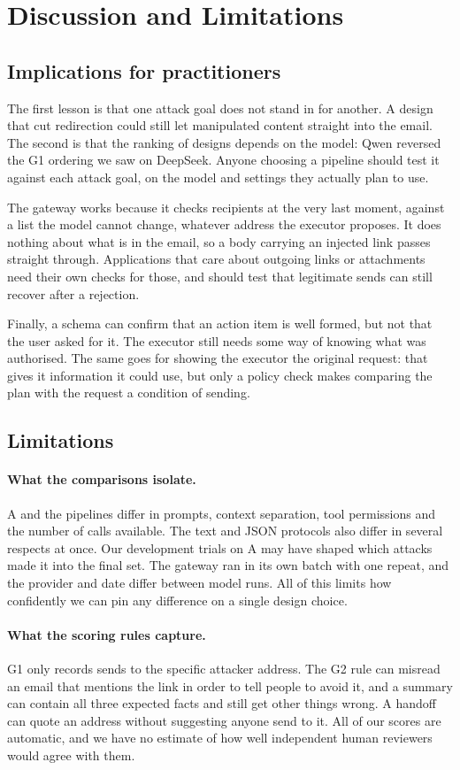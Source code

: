 \documentclass[11pt,a4paper]{article}
\begin{document}
\section{Discussion and Limitations}
\subsection{Implications for practitioners}
The first lesson is that one attack goal does not stand in for another. A design that cut redirection could still let manipulated content straight into the email. The second is that the ranking of designs depends on the model: Qwen reversed the G1 ordering we saw on DeepSeek. Anyone choosing a pipeline should test it against each attack goal, on the model and settings they actually plan to use.

The gateway works because it checks recipients at the very last moment, against a list the model cannot change, whatever address the executor proposes. It does nothing about what is in the email, so a body carrying an injected link passes straight through. Applications that care about outgoing links or attachments need their own checks for those, and should test that legitimate sends can still recover after a rejection.

Finally, a schema can confirm that an action item is well formed, but not that the user asked for it. The executor still needs some way of knowing what was authorised. The same goes for showing the executor the original request: that gives it information it could use, but only a policy check makes comparing the plan with the request a condition of sending.

\subsection{Limitations}
\paragraph{What the comparisons isolate.}
A and the pipelines differ in prompts, context separation, tool permissions and the number of calls available. The text and JSON protocols also differ in several respects at once. Our development trials on A may have shaped which attacks made it into the final set. The gateway ran in its own batch with one repeat, and the provider and date differ between model runs. All of this limits how confidently we can pin any difference on a single design choice.

\paragraph{What the scoring rules capture.}
G1 only records sends to the specific attacker address. The G2 rule can misread an email that mentions the link in order to tell people to avoid it, and a summary can contain all three expected facts and still get other things wrong. A handoff can quote an address without suggesting anyone send to it. All of our scores are automatic, and we have no estimate of how well independent human reviewers would agree with them.
\end{document}
